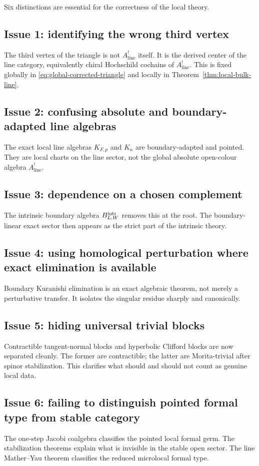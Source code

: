 Six distinctions are essential for the correctness of the local theory.

\subsection*{Issue 1: identifying the wrong third vertex}
The third vertex of the triangle is not $A^!_{\mathrm{line}}$ itself. It is the derived center of the line category, equivalently chiral Hochschild cochains of $A^!_{\mathrm{line}}$. This is fixed globally in \eqref{eq:global-corrected-triangle} and locally in Theorem~\ref{thm:local-bulk-line}.

\subsection*{Issue 2: confusing absolute and boundary-adapted line algebras}
The exact local line algebras $K_{F,p}$ and $K_\kappa$ are boundary-adapted and pointed. They are local charts on the line sector, not the global absolute open-colour algebra $A^!_{\mathrm{line}}$.

\subsection*{Issue 3: dependence on a chosen complement}
The intrinsic boundary algebra $B^{\mathrm{intr}}_{L,W}$ removes this at the root. The boundary-linear exact sector then appears as the strict part of the intrinsic theory.

\subsection*{Issue 4: using homological perturbation where exact elimination is available}
Boundary Kuranishi elimination is an exact algebraic theorem, not merely a perturbative transfer. It isolates the singular residue sharply and canonically.

\subsection*{Issue 5: hiding universal trivial blocks}
Contractible tangent-normal blocks and hyperbolic Clifford blocks are now separated cleanly. The former are contractible; the latter are Morita-trivial after spinor stabilization. This clarifies what should and should not count as genuine local data.

\subsection*{Issue 6: failing to distinguish pointed formal type from stable category}
The one-step Jacobi coalgebra classifies the pointed local formal germ. The stabilization theorems explain what is invisible in the stable open sector. The line Mather--Yau theorem classifies the reduced microlocal formal type.

